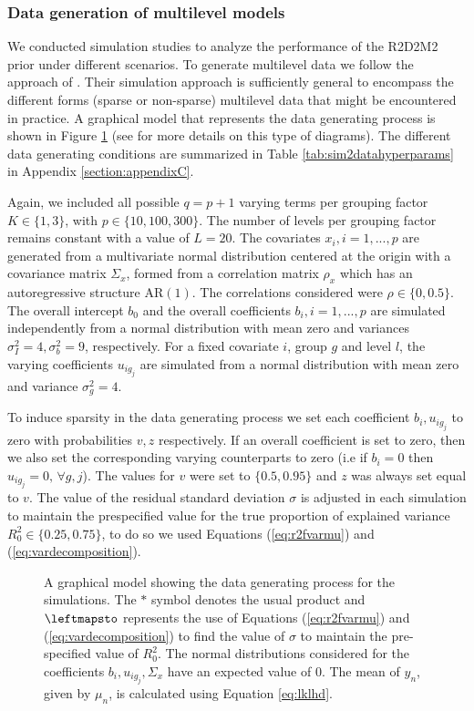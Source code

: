 \subsubsection{Data generation of multilevel models}
We conducted simulation studies to analyze the performance of the R2D2M2 prior under different scenarios. To generate multilevel data we follow the approach of \cite{catalina2020projection}. Their simulation approach is sufficiently general to encompass the different forms (sparse or non-sparse) multilevel data that might be encountered in practice. A graphical model that represents the data generating process is shown in Figure \ref{fig:datagen} (see \cite{TikzBayesNet} for more details on this type of diagrams). The different data generating conditions are summarized in Table \ref{tab:sim2datahyperparams} in Appendix \ref{section:appendixC}.

Again, we included all possible $q=p+1$ varying terms per grouping factor $K \in\{1,3\}$, with $p\in \{10,100,300\}$. The number of levels per grouping factor remains constant with a value of $L=20$. The covariates $x_i, i=1,...,p$ are generated from a multivariate normal distribution centered at the origin with a covariance matrix $\Sigma_x$, formed from a correlation matrix $\rho_x$ which has  an autoregressive structure $\text{AR}(1)$. The correlations considered were $\rho \in  \{0,0.5\}$.  The overall intercept $b_{0}$ and the overall coefficients $b_i, i=1,...,p$ are simulated independently from a normal distribution with mean zero and variances $\sigma_I^2=4, \sigma_b^2=9$, respectively. For a fixed covariate $i$, group $g$ and level $l$, the varying coefficients $u_{ig_j}$ are simulated from a normal distribution with mean zero and variance $\sigma_g^2=4$.

To induce sparsity in the data generating process we set each coefficient $b_i, u_{ig_j}$ to zero with probabilities $v, z$ respectively. If an overall coefficient is set to zero, then we also set the corresponding varying counterparts to zero (i.e if $b_i=0$ then $u_{ig_j}=0,\, \forall g, j$). The values for $v$ were set to $\{0.5,0.95\}$ and $z$ was always set equal to $v$. The value of the residual standard deviation $\sigma$ is adjusted in each simulation to maintain the prespecified value for the true proportion of explained variance $R^2_0 \in \{0.25, 0.75\} $, to do so we used Equations (\ref{eq:r2fvarmu}) and (\ref{eq:vardecomposition}).
\begin{figure}[t!]
\centering

  \caption{ A graphical model showing the data generating process for the simulations. The $*$ symbol denotes the usual product and $\leftmapsto$ represents the use of Equations (\ref{eq:r2fvarmu}) and (\ref{eq:vardecomposition}) to find the value of $\sigma$ to maintain the pre-specified value of $R_0^2$. The normal distributions considered for the coefficients $b_i,u_{ig_j}, \Sigma_x$ have an expected value of 0. The mean of $y_n$, given by $\mu_n$, is calculated using Equation \eqref{eq:lklhd}.  }
  \label{fig:datagen}
\end{figure}

